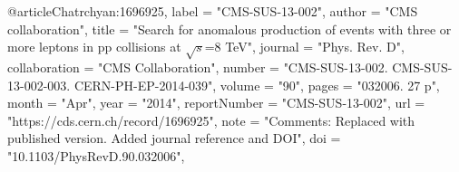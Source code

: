 @article{Chatrchyan:1696925,
      label          = "CMS-SUS-13-002",
      author        = "{CMS collaboration}",
      title         = "{Search for anomalous production of events with three or
                       more leptons in pp collisions at $\sqrt{s}$=8 TeV}",
      journal       = "Phys. Rev. D",
      collaboration = "CMS Collaboration",
      number        = "CMS-SUS-13-002. CMS-SUS-13-002-003. CERN-PH-EP-2014-039",
      volume        = "90",
      pages         = "032006. 27 p",
      month         = "Apr",
      year          = "2014",
      reportNumber  = "CMS-SUS-13-002",
      url           = "https://cds.cern.ch/record/1696925",
      note          = "Comments: Replaced with published version. Added journal
                       reference and DOI",
      doi           = "10.1103/PhysRevD.90.032006",
}

